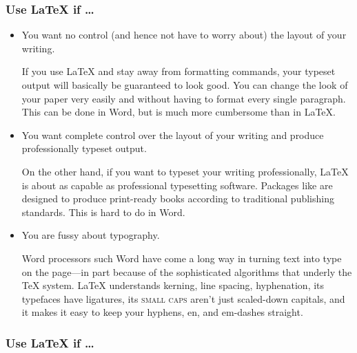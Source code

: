 \begin{frame}
\begin{frame}
\begin{itemize}
\end{itemize}

\end{frame}

\begin{frame}
\frametitle{Use \LaTeX{} if \dots}

\begin{itemize}
\item You want no control (and hence not have to worry about) the
  layout of your writing.

\begin{articleonly}
If you use \LaTeX{} and stay away from formatting commands, your
typeset output will basically be guaranteed to look good.  You can
change the look of your paper very easily and without having to format
every single paragraph.  This can be done in Word, but is much more
cumbersome than in \LaTeX.
\end{articleonly}

\item You want complete control over the layout of your writing and
  produce professionally typeset output.

\begin{articleonly}
On the other hand, if you want to typeset your writing professionally,
\LaTeX{} is about as capable as professional typesetting
software. Packages like \cite{memoir} are designed to produce
print-ready books according to traditional publishing standards. This
is hard to do in Word.
\end{articleonly}

\item You are fussy about typography.

\begin{articleonly}
Word processors such Word have come a long way in turning text into
type on the page---in part because of the sophisticated algorithms
that underly the \TeX{} system.  \LaTeX{} understands kerning, line
spacing, hyphenation, its typefaces have ligatures, its \textsc{small
  caps} aren't just scaled-down capitals, and it makes it easy to keep
your hyphens, en, and em-dashes straight.
\end{articleonly}
\end{itemize}

\end{frame}



\begin{frame}
\frametitle{Use \LaTeX{} if \dots}


\end{frame}
\end{frame}

